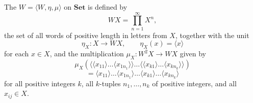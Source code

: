 The  $W = \langle W, \eta, \mu \rangle$ on $\mathbf{Set}$ is defined by
$$WX = \prod_{n=1}^{\infty} X^n,$$
the set of all words of positive length in letters from $X$, together with the unit
$$\eta_X : X \to WX, \qquad \eta_X(x) = \langle x \rangle$$
for each $x \in X$, and the multiplication $\mu_X : W^2 X \to WX$ given by
$$\mu_X(\langle \langle x_{11} \rangle \dots \langle x_{1n_1} \rangle \rangle \dots \langle \langle x_{k1} \rangle \dots \langle x_{kn_k} \rangle \rangle)$$
$$= \langle x_{11} \rangle \dots \langle x_{1n_1} \rangle \dots \langle x_{k1} \rangle \dots \langle x_{kn_k} \rangle$$
for all positive integers $k$, all $k$-tuples $n_1, \dots, n_k$ of positive integers, and all $x_{ij} \in X$.
